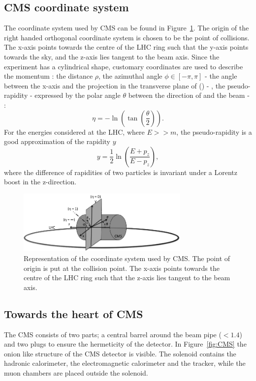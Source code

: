 \subsection{CMS coordinate system}
The coordinate system used by CMS can be found in Figure~\ref{fig:CMScoord}. The origin of the right handed orthogonal coordinate system is chosen to be the point of collisions. The x-axis points towards the centre of the LHC ring such that the y-axis points towards the sky, and the z-axis lies tangent to the beam axis. Since the experiment has a cylindrical shape, customary coordinates are used to describe the momentum \impuls: the distance $\rho$, the azimuthal angle $\phi \in \left[-\pi,\pi\right]$ - the angle between the x-axis and the projection in the transverse plane of \impuls (\trimpuls) - , the pseudo-rapidity \psrap - expressed by the polar angle $\theta$ between the direction of \impuls and the beam - : 
\begin{equation}
\eta = - \ln \left(\tan \left(\frac{\theta}{2}\right)\right).
\end{equation}
For the energies considered at the LHC, where $E >> m$, the pseudo-rapidity is a good approximation of the rapidity $y$
\begin{equation}
y = \frac{1}{2} \ln \left(\frac{E + p_z}{E - p_z}\right), 
\end{equation}
where the difference of rapidities of two particles is invariant under a Lorentz boost in the z-direction.
 \begin{figure}[ht]
	\centering
	\includegraphics[width=0.75\textwidth]{2_ExperimentalSetup/Figures/imageedit_1_9146672677}
	\caption{Representation of the coordinate system used by CMS. The point of origin is put at the collision point. The x-axis points towards the centre of the LHC ring such that the z-axis lies tangent to the beam axis. }
	\label{fig:CMScoord}
\end{figure}

\subsection{Towards the heart of CMS}
The CMS consists of two parts; a central barrel around the beam pipe (\abspsrap $<1.4$) and two plugs to ensure the hermeticity of the detector. In Figure~\ref{fig:CMS} the onion like structure of the CMS detector is visible. The solenoid contains the hadronic calorimeter,  the electromagnetic calorimeter and the tracker, while the muon chambers are placed outside the solenoid.


